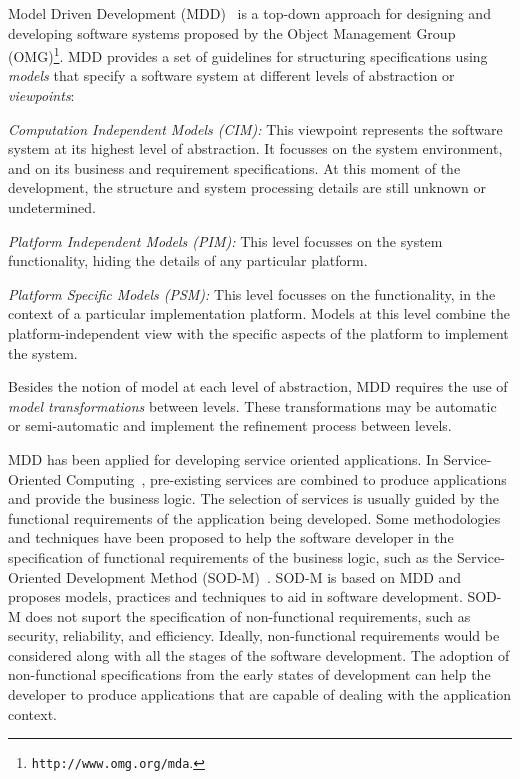 Model Driven Development (MDD)~\cite{Favre06arigorous} is a top-down approach for  designing and developing software systems 
proposed by the Object Management Group
(OMG)\footnote{\texttt{http://www.omg.org/mda}.}. 
MDD provides a set of
guidelines for  structuring  specifications using
 \textit{models} that specify a software system at different levels of abstraction or \textit{viewpoints}: 

\begin{trivlist}
\item \textit{Computation Independent Models (CIM):} This viewpoint represents the software system at its highest level of abstraction. It focusses on the system
environment, and on its business and requirement specifications. 
At this moment of the development, the structure and system processing details are still unknown or undetermined. 
 
\item \textit{Platform Independent Models (PIM):} This level focusses on the system functionality, hiding the details of any particular platform. 

\item \textit{Platform Specific Models (PSM):} This level focusses on the functionality, in the context of a particular implementation platform.
Models at this level combine the platform-independent view with the specific aspects of the platform to implement the system.  
\end{trivlist}
%
Besides the notion of model at each level of abstraction, MDD requires the use of \textit{model transformations} between levels.
These transformations may be automatic or semi-automatic and implement the refinement process between levels. 

MDD has been applied for developing service oriented applications.
In Service-Oriented Computing~\cite{Papazoglou2007}, pre-existing services are
combined to produce applications and provide the business logic. The selection of services is usually guided by the functional requirements of the application being developed. 
Some methodologies and techniques have been proposed to help the software
developer in the specification of functional requirements of the business logic,
such as the Service-Oriented Development Method
(SOD-M)~\cite{decastro1}. 
SOD-M is based on MDD and proposes
models, practices and techniques to aid in software development. SOD-M does not
 suport  the specification of non-functional requirements, such as
security, reliability, and efficiency. Ideally, non-functional requirements
would be considered along with all the stages of the software development. The
adoption of non-functional specifications from the early states of development
can help the developer to produce applications that are capable of dealing with
the application context.


